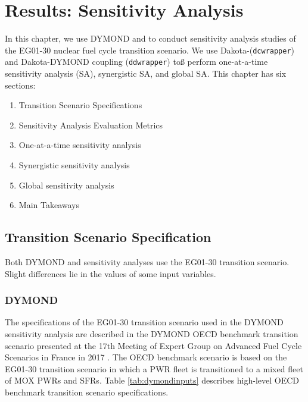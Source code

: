 \chapter{Results: Sensitivity Analysis}
In this chapter, we use DYMOND and \Cyclus to conduct 
sensitivity analysis studies of the 
EG01-30 nuclear fuel cycle transition scenario. 
We use Dakota-\Cyclus (\texttt{dcwrapper}) 
and Dakota-DYMOND coupling (\texttt{ddwrapper}) toß
perform  
one-at-a-time sensitivity analysis (SA), synergistic 
SA, and global SA. 
This chapter has six sections: 
\begin{enumerate}
    \item Transition Scenario Specifications 
    \item Sensitivity Analysis Evaluation Metrics 
    \item One-at-a-time sensitivity analysis
    \item Synergistic sensitivity analysis
    \item Global sensitivity analysis
    \item Main Takeaways 
\end{enumerate}

\section{Transition Scenario Specification}
Both DYMOND and \Cyclus sensitivity analyses 
use the EG01-30 transition scenario.
Slight differences lie in the values of some input variables. 

\subsection{DYMOND}
The specifications of the EG01-30 transition scenario used in the 
DYMOND sensitivity analysis
are described in the DYMOND OECD benchmark transition 
scenario presented at the 17th Meeting of Expert Group on Advanced 
Fuel Cycle Scenarios in France in 2017 
\cite{oecd_nuclear_energy_agency_wpfc_nodate}. 
The OECD benchmark scenario is based on the EG01-30 transition scenario 
in which a \gls{PWR} fleet is transitioned to
a mixed fleet of \gls{MOX} \glspl{PWR} and \glspl{SFR}. 
Table \ref{tab:dymondinputs} describes high-level OECD benchmark transition 
scenario specifications. 

